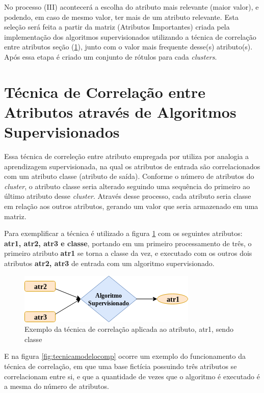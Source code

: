 No processo (III) acontecerá a escolha do atributo mais relevante (maior valor), e podendo, em caso de mesmo valor, ter mais de um atributo relevante. Esta seleção será feita a partir da matriz (Atributos Importantes) criada pela implementação dos algoritmos supervisionados utilizando a técnica de correlação entre atributos seção (\ref{cap:ferramentas:sec:tecnica}), junto com o valor mais frequente desse(s) atributo(s). Após essa etapa é criado um conjunto de rótulos para cada \textit{clusters}. 

\section{Técnica de Correlação entre Atributos através de Algoritmos Supervisionados}\label{cap:ferramentas:sec:tecnica}

Essa técnica de correleção entre atributo empregada por \cite{Lopes2016} utiliza por analogia a aprendizagem supervisionada, na qual os atributos de entrada são correlacionados com um atributo classe (atributo de saída). Conforme o número de atributos do \textit{cluster}, o atributo classe seria alterado seguindo uma sequência do primeiro ao último atributo desse \textit{cluster}. Através desse processo, cada atributo seria classe 
em relação aos outros atributos, gerando um valor que seria armazenado em uma matriz. 

Para exemplificar a técnica é utilizado a figura \ref{fig:tecnicamodelo} com os seguintes atributos: \textbf{atr1, atr2, atr3 e classe}, portando em um primeiro processamento de três, o primeiro atributo \textbf{atr1} se torna a classe da vez, e executado com os outros dois atributos \textbf{atr2, atr3} de entrada com um algoritmo supervisionado.

\begin{figure}[h!]
        \centering
        \includegraphics[scale=0.7]{figs/tecnicamodelo.png}
        \caption{Exemplo da técnica de correlação aplicada ao atributo, atr1, sendo classe } \label{fig:tecnicamodelo}
\end{figure}

E na figura \ref{fig:tecnicamodelocomp} ocorre um exemplo do funcionamento da técnica de correlação, em que uma base fictícia possuindo três atributos se correlacionam entre si, e que a quantidade de vezes que o algoritmo é executado é a mesma do número de atributos.

